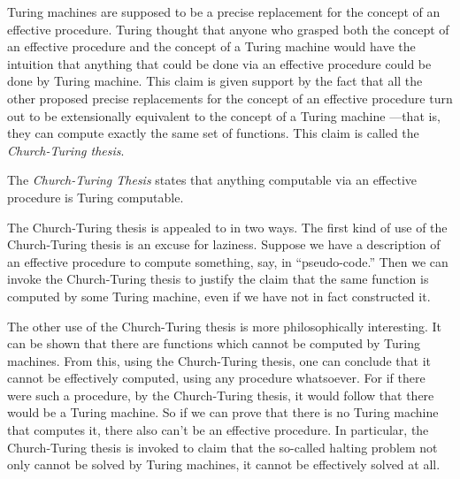 \documentclass[../../../include/open-logic-section]{subfiles}
\begin{document}

Turing machines are supposed to be a precise replacement for the
concept of an effective procedure. Turing thought that anyone who
grasped both the concept of an effective procedure and the concept
of a Turing machine would have the intuition that anything that could
be done via an effective procedure could be done by Turing machine.
This claim is given support by the fact that all the other proposed
precise replacements for the concept of an effective procedure turn
out to be extensionally equivalent to the concept of a Turing machine
---that is, they can compute exactly the same set of functions. This
claim is called the \emph{Church-Turing thesis}.

\begin{defn}
The \emph{Church-Turing Thesis} states that anything computable via 
an effective procedure is Turing computable.
\end{defn}

The Church-Turing thesis is appealed to in two ways.  The first kind
of use of the Church-Turing thesis is an excuse for laziness.  Suppose
we have a description of an effective procedure to compute something,
say, in ``pseudo-code.''  Then we can invoke the Church-Turing thesis
to justify the claim that the same function is computed by some Turing
machine, even if we have not in fact constructed it.

The other use of the Church-Turing thesis is more philosophically
interesting.  It can be shown that there are functions which cannot be
computed by Turing machines.  From this, using the Church-Turing
thesis, one can conclude that it cannot be effectively computed, using
any procedure whatsoever.  For if there were such a procedure, by the
Church-Turing thesis, it would follow that there would be a Turing
machine.  So if we can prove that there is no Turing machine that
computes it, there also can't be an effective procedure.  In
particular, the Church-Turing thesis is invoked to claim that the
so-called halting problem not only cannot be solved by Turing
machines, it cannot be effectively solved at all.
\end{document}
